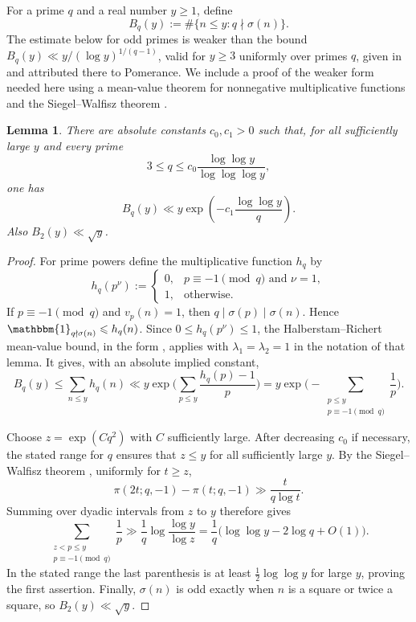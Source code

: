 \documentclass[11pt,letterpaper,reqno]{amsart}
\numberwithin{equation}{section}
\newtheorem{lemma}[theorem]{Lemma}
\theoremstyle{remark}
\renewcommand{\leq}{\leqslant}
\renewcommand{\geq}{\geqslant}
\begin{document}
For a prime $q$ and a real number $y\geq1$, define
\[
 B_q(y):=\#\{n\leq y:q\nmid\sigma(n)\}.
\]
The estimate below for odd primes is weaker than the bound
$B_q(y)\ll y/(\log y)^{1/(q-1)}$, valid for $y\geq3$ uniformly
over primes $q$, given in \cite[Lemma~2.1]{Pollack} and attributed
there to Pomerance. We include a proof of the weaker form needed here using
a mean-value theorem for nonnegative multiplicative functions and the
Siegel--Walfisz theorem \cite{Tenenbaum}.

\begin{lemma}\label{lem:sigma-rate}
There are absolute constants $c_0,c_1>0$ such that, for all sufficiently
large $y$ and every prime
\[
 3\leq q\leq c_0\frac{\log\log y}{\log\log\log y},
\]
one has
\[
 B_q(y)\ll y\exp\!\left(-c_1\frac{\log\log y}q\right).
\]
Also $B_2(y)\ll\sqrt y$.
\end{lemma}

\begin{proof}
For prime powers define the multiplicative function $h_q$ by
\[
 h_q(p^\nu):=
 \begin{cases}
 0,& p\equiv-1\pmod q\text{ and }\nu=1,\\
 1,& \text{otherwise}.
 \end{cases}
\]
If $p\equiv-1\pmod q$ and $v_p(n)=1$, then
$q\mid\sigma(p)\mid\sigma(n)$. Hence
$\mathbbm{1}_{q\nmid\sigma(n)}\leq h_q(n)$. Since $0\leq h_q(p^\nu)\leq1$,
the Halberstam--Richert mean-value bound, in the form
\cite[Lemma~2.4]{Pollack}, applies with $\lambda_1=\lambda_2=1$ in the notation of that lemma.
It gives, with an absolute implied constant,
\[
 B_q(y)
 \leq\sum_{n\leq y}h_q(n)
 \ll y\exp\bigg(\sum_{p\leq y}\frac{h_q(p)-1}{p}\bigg)
 =y\exp\bigg(-\sum_{\substack{p\leq y\\p\equiv-1\pmod q}}\frac1p\bigg).
\]

Choose $z=\exp(Cq^2)$ with $C$ sufficiently large. After decreasing
$c_0$ if necessary, the stated range for $q$ ensures that $z\leq y$ for
all sufficiently large $y$. By the Siegel--Walfisz theorem \cite{Tenenbaum}, uniformly for
$t\geq z$,
\[
 \pi(2t;q,-1)-\pi(t;q,-1)\gg\frac{t}{q\log t}.
\]
Summing over dyadic intervals from $z$ to $y$ therefore gives
\[
 \sum_{\substack{z<p\leq y\\p\equiv-1\pmod q}}\frac1p
 \gg \frac1q\log\frac{\log y}{\log z}
 =\frac1q\bigl(\log\log y-2\log q+O(1)\bigr).
\]
In the stated range the last parenthesis is at least
$\tfrac12\log\log y$ for large $y$, proving the first assertion.
Finally, $\sigma(n)$ is odd exactly when $n$ is a square or twice a square,
so $B_2(y)\ll\sqrt y$.
\end{proof}
\end{document}
